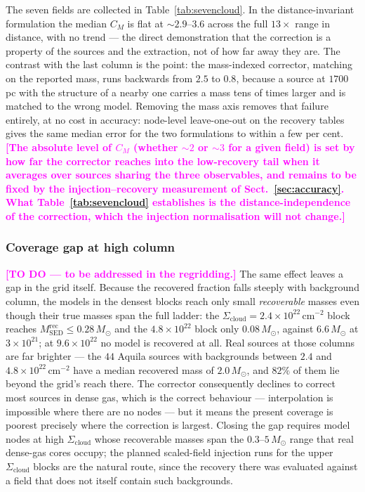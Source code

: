 \documentclass[11pt,a4paper]{article}
\newcommand{\note}[1]{\textcolor{magenta}{\textbf{[#1]}}}
\newcommand{\msun}{M_{\odot}}
\newcommand{\Scloud}{\Sigma_{\mathrm{cloud}}}
\begin{document}
The seven fields are collected in Table~\ref{tab:sevencloud}. In the
distance-invariant formulation the median $C_M$ is flat at $\sim\!2.9$--$3.6$
across the full $13\times$ range in distance, with no trend --- the direct
demonstration that the correction is a property of the sources and the
extraction, not of how far away they are. The contrast with the last column is
the point: the mass-indexed corrector, matching on the reported mass, runs
backwards from $2.5$ to $0.8$, because a source at $1700$\,pc with the structure
of a nearby one carries a mass tens of times larger and is matched to the wrong
model. Removing the mass axis removes that failure entirely, at no cost in
accuracy: node-level leave-one-out on the recovery tables gives the same median
error for the two formulations to within a few per cent.
\note{The absolute level of $C_M$ (whether $\sim\!2$ or $\sim\!3$ for a given
field) is set by how far the corrector reaches into the low-recovery tail when
it averages over sources sharing the three observables, and remains to be fixed
by the injection--recovery measurement of Sect.~\ref{sec:accuracy}. What
Table~\ref{tab:sevencloud} establishes is the distance-independence of the
correction, which the injection normalisation will not change.}

\subsubsection*{Coverage gap at high column}
\label{sec:highsigma}

\note{TO DO --- to be addressed in the regridding.} The same effect leaves a
gap in the grid itself. Because the recovered fraction falls steeply with
background column, the models in the densest blocks reach only small
\emph{recoverable} masses even though their true masses span the full ladder:
the $\Scloud=2.4\times10^{22}\,\mathrm{cm^{-2}}$ block reaches
$M^{\mathrm{rec}}_{\mathrm{SED}}\le0.28\,\msun$ and the
$4.8\times10^{22}$ block only $0.08\,\msun$, against $6.6\,\msun$ at
$3\times10^{21}$; at $9.6\times10^{22}$ no model is recovered at all. Real
sources at those columns are far brighter --- the $44$ Aquila sources with
backgrounds between $2.4$ and $4.8\times10^{22}\,\mathrm{cm^{-2}}$ have a
median recovered mass of $2.0\,\msun$, and $82\%$ of them lie beyond the
grid's reach there. The corrector consequently declines to correct most
sources in dense gas, which is the correct behaviour --- interpolation is
impossible where there are no nodes --- but it means the present coverage is
poorest precisely where the correction is largest. Closing the gap requires
model nodes at high $\Scloud$ whose recoverable masses span the
$0.3$--$5\,\msun$ range that real dense-gas cores occupy; the planned
scaled-field injection runs for the upper $\Scloud$ blocks are the natural
route, since the recovery there was evaluated against a field that does not
itself contain such backgrounds.
\end{document}
